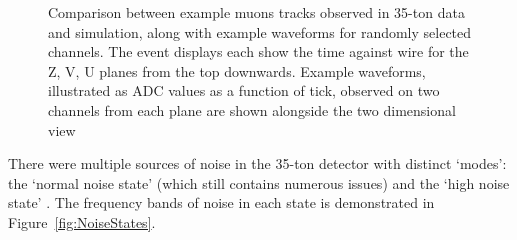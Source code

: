 \begin{figure}
  \caption[Comparison between example muons tracks observed in 35-ton data and simulation, along with example waveforms for randomly selected channels.]{Comparison between example muons tracks observed in 35-ton data and simulation, along with example waveforms for randomly selected channels.  The event displays each show the time against wire for the Z, V, U planes from the top downwards.  Example waveforms, illustrated as ADC values as a function of tick, observed on two channels from each plane are shown alongside the two dimensional view}
  \label{fig:DataSimulationNoiseComparison}

\end{figure}

There were multiple sources of noise in the 35-ton detector with distinct `modes': the `normal noise state' (which still contains numerous issues) and the `high noise state' \cite{35tonNoise2016}.  The frequency bands of noise in each state is demonstrated in Figure~\ref{fig:NoiseStates}.

